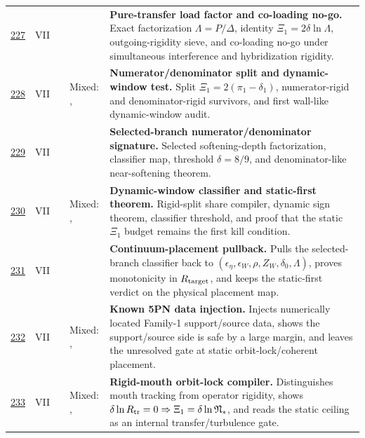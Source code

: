 {\begin{longtable}{@{}L{0.055\textwidth}L{0.075\textwidth}L{0.145\textwidth}L{0.235\textwidth}L{0.43\textwidth}@{}}
\addlinespace
\hyperref[stage:227]{227} & VII &  & \StatusExactClosure{} & \textbf{Pure-transfer load factor and co-loading no-go.} Exact factorization \(\Lambda=P/\Delta\), identity \(\Xi_1=2\delta\ln\Lambda\), outgoing-rigidity sieve, and co-loading no-go under simultaneous interference and hybridization rigidity. \\
\addlinespace
\hyperref[stage:228]{228} & VII &  & Mixed: \StatusExactClosure{}, \StatusNumerical{} & \textbf{Numerator/denominator split and dynamic-window test.} Split \(\Xi_1=2(\pi_1-\delta_1)\), numerator-rigid and denominator-rigid survivors, and first wall-like dynamic-window audit. \\
\addlinespace
\hyperref[stage:229]{229} & VII &  & \StatusExactClosure{} & \textbf{Selected-branch numerator/denominator signature.} Selected softening-depth factorization, classifier map, threshold \(\delta=8/9\), and denominator-like near-softening theorem. \\
\addlinespace
\hyperref[stage:230]{230} & VII &  & Mixed: \StatusExactClosure{}, \StatusNumerical{} & \textbf{Dynamic-window classifier and static-first theorem.} Rigid-split share compiler, dynamic sign theorem, classifier threshold, and proof that the static \(\Xi_1\) budget remains the first kill condition. \\
\addlinespace
\hyperref[stage:231]{231} & VII &  & \StatusExactClosure{} & \textbf{Continuum-placement pullback.} Pulls the selected-branch classifier back to \((\epsilon_\eta,\epsilon_W,\rho,Z_W,\delta_0,\Lambda)\), proves monotonicity in \(R_{\rm target}\), and keeps the static-first verdict on the physical placement map. \\
\addlinespace
\hyperref[stage:232]{232} & VII &  & Mixed: \StatusNumerical{}, \StatusOpen{} & \textbf{Known 5PN data injection.} Injects numerically located Family-1 support/source data, shows the support/source side is safe by a large margin, and leaves the unresolved gate at static orbit-lock/coherent placement. \\
\addlinespace
\hyperref[stage:233]{233} & VII &  & Mixed: \StatusExactClosure{}, \StatusOpen{} & \textbf{Rigid-mouth orbit-lock compiler.} Distinguishes mouth tracking from operator rigidity, shows \(\delta\ln R_{\rm tr}=0\Rightarrow\Xi_1=\delta\ln\mathfrak N_*\), and reads the static ceiling as an internal transfer/turbulence gate. \\

\end{longtable}}

